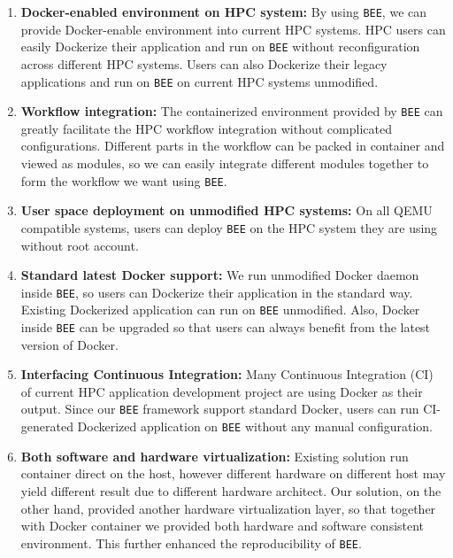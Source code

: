 \begin{enumerate}
\item \textbf{Docker-enabled environment on HPC system:}
By using \texttt{BEE}, we can provide Docker-enable environment into current HPC systems. HPC users can easily Dockerize their application and run on \texttt{BEE} without reconfiguration across different HPC systems. Users can also Dockerize their legacy applications and run on \texttt{BEE} on current HPC systems unmodified.

\item \textbf{Workflow integration:}
The containerized environment provided by \texttt{BEE} can greatly facilitate the HPC workflow integration without complicated configurations. Different parts in the workflow can be packed in container and viewed as modules, so we can easily integrate different modules together to form the workflow we want using \texttt{BEE}.

\item \textbf{User space deployment on unmodified HPC systems:}
On all QEMU compatible systems, users can deploy \texttt{BEE} on the HPC system they are using without root account.

\item \textbf{Standard latest Docker support:}
We run unmodified Docker daemon inside \texttt{BEE}, so users can Dockerize their application in the standard way. Existing Dockerized application can run on \texttt{BEE} unmodified. Also, Docker inside \texttt{BEE} can be upgraded so that users can always benefit from the latest version of Docker.

\item \textbf{Interfacing Continuous Integration:}
Many Continuous Integration (CI) of current HPC application development project are using Docker as their output. Since our \texttt{BEE} framework support standard Docker, users can run CI-generated Dockerized application on \texttt{BEE} without any manual configuration.

\item \textbf{Both software and hardware virtualization:}
Existing solution run container direct on the host, however different hardware on different host may yield different result due to different hardware architect. Our solution, on the other hand, provided another hardware virtualization layer, so that together with Docker container we provided both hardware and software consistent environment. This further enhanced the reproducibility of \texttt{BEE}.



\end{enumerate}
